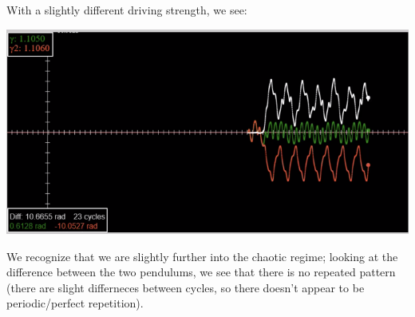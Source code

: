 With a slightly different driving strength, we see:
\begin{center}
    \includegraphics[scale=0.7]{Lecture-33/l33-img4.png}
\end{center}
We recognize that we are slightly further into the chaotic regime; looking at the difference between the two pendulums, we see that there is no repeated pattern (there are slight differneces between cycles, so there doesn't appear to be periodic/perfect repetition).

